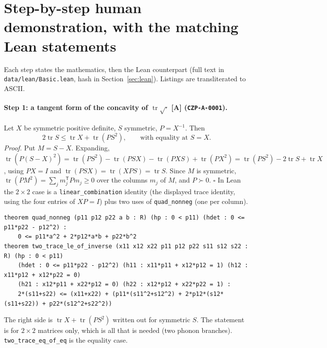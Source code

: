 \documentclass[10pt]{article}
\newcommand{\tier}[1]{\textsf{[#1]}}
\newcommand{\tA}{\tier{A}}
\newcommand{\lean}[1]{\texttt{#1}}
\newcommand{\tr}{\operatorname{tr}}
\begin{document}
\section{Step-by-step human demonstration, with the matching Lean statements}\label{sec:human}
Each step states the mathematics, then the Lean counterpart (full text in \texttt{data/lean/Basic.lean}, hash in Section~\ref{sec:lean}). Listings are transliterated to ASCII.

\paragraph{Step 1: a tangent form of the concavity of $\tr\sqrt{\cdot}$ \tA{} (\texttt{CZP-A-0001}).}
Let $X$ be symmetric positive definite, $S$ symmetric, $P=X^{-1}$. Then
\[2\tr S\le\tr X+\tr(PS^2),\qquad\text{with equality at }S=X.\]
\emph{Proof.} Put $M=S-X$. Expanding, $\tr(P(S-X)^2)=\tr(PS^2)-\tr(PSX)-\tr(PXS)+\tr(PX^2)=\tr(PS^2)-2\tr S+\tr X$, using $PX=I$ and $\tr(PSX)=\tr(XPS)=\tr S$. Since $M$ is symmetric, $\tr(PM^2)=\sum_j m_j^{\mathsf T}Pm_j\ge0$ over the columns $m_j$ of $M$, and $P\succ0$. $\square$
In Lean the $2\times2$ case is a \lean{linear\_combination} identity (the displayed trace identity, using the four entries of $XP=I$) plus two uses of \lean{quad\_nonneg} (one per column).
\begin{lstlisting}
theorem quad_nonneg (p11 p12 p22 a b : R) (hp : 0 < p11) (hdet : 0 <= p11*p22 - p12^2) :
    0 <= p11*a^2 + 2*p12*a*b + p22*b^2
theorem two_trace_le_of_inverse (x11 x12 x22 p11 p12 p22 s11 s12 s22 : R) (hp : 0 < p11)
    (hdet : 0 <= p11*p22 - p12^2) (h11 : x11*p11 + x12*p12 = 1) (h12 : x11*p12 + x12*p22 = 0)
    (h21 : x12*p11 + x22*p12 = 0) (h22 : x12*p12 + x22*p22 = 1) :
    2*(s11+s22) <= (x11+x22) + (p11*(s11^2+s12^2) + 2*p12*(s12*(s11+s22)) + p22*(s12^2+s22^2))
\end{lstlisting}
The right side is $\tr X+\tr(PS^2)$ written out for symmetric $S$. The statement is for $2\times2$ matrices only, which is all that is needed (two phonon branches). \lean{two\_trace\_eq\_of\_eq} is the equality case.
\end{document}
